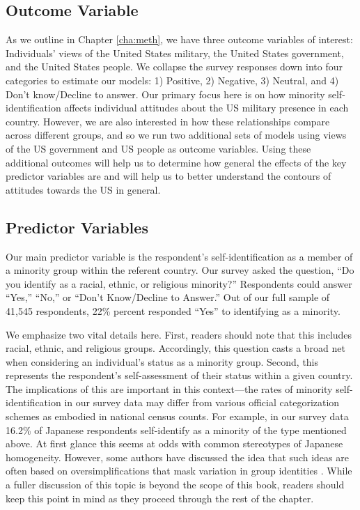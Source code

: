 \subsection*{Outcome Variable}

As we outline in Chapter \ref{cha:meth}, we have three outcome variables of interest: Individuals' views of the United States military, the United States government, and the United States people. We collapse the survey responses down into four categories to estimate our models: 1) Positive, 2) Negative, 3) Neutral, and 4) Don't know/Decline to answer. Our primary focus here is on how minority self-identification affects individual attitudes about the US military presence  in each country. However, we are also interested in how these relationships compare across different groups, and so we run two additional sets of models using views of the US government and US people as outcome variables. Using these additional outcomes will help us to determine how general the effects of the key predictor variables are and will help us to better understand the contours of attitudes towards the US in general. 

\subsection*{Predictor Variables}

Our main predictor variable is the respondent's self-identification as a member of a minority group within the referent country. Our survey asked the question, ``Do you identify as a racial, ethnic, or religious minority?'' Respondents could answer ``Yes,'' ``No,'' or ``Don't Know/Decline to Answer.'' Out of our full sample of 41,545 respondents, 22\% percent responded ``Yes'' to identifying as a minority.  

We emphasize two vital details here. First, readers should note that this includes racial, ethnic, and religious groups. Accordingly, this question casts a broad net when considering an individual's status as a minority group. Second, this represents the respondent's self-assessment of their status within a given country. The implications of this are important in this context---the rates of minority self-identification in our survey data may differ from various official categorization schemes as embodied in national census counts. For example, in our survey data 16.2\% of Japanese respondents self-identify as a minority of the type mentioned above. At first glance this seems at odds with common stereotypes of Japanese homogeneity. However, some authors have discussed the idea that such ideas are often based on oversimplifications that mask variation in group identities \cite{Johnson2019}. While a fuller discussion of this topic is beyond the scope of this book, readers should keep this point in mind as they proceed through the rest of the chapter. 

